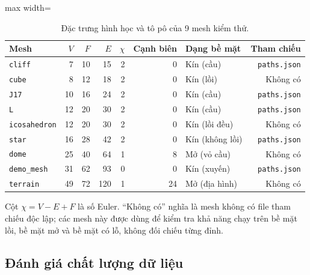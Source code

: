 \begin{table}[!t]
  \caption{Đặc trưng hình học và tô pô của 9 mesh kiểm thử.}
  \label{tab:dac-trung-mesh}
  {\fontsize{7}{8.6}\selectfont
  \setlength{\tabcolsep}{2.5pt}%
  \begin{adjustbox}{max width=\textwidth}
  \begin{tabular}{@{}lrrrrrlr@{}}
    \toprule
    \textbf{Mesh} & $V$ & $F$ & $E$ & $\chi$ & \textbf{Cạnh biên} &
    \textbf{Dạng bề mặt} & \textbf{Tham chiếu} \\
    \midrule
    \texttt{cliff}        & 7  & 10 & 15  & 2 & 0  & Kín (cầu)       & \texttt{paths.json} \\
    \texttt{cube}         & 8  & 12 & 18  & 2 & 0  & Kín (lồi)       & Không có \\
    \texttt{J17}          & 10 & 16 & 24  & 2 & 0  & Kín (cầu)       & \texttt{paths.json} \\
    \texttt{L}            & 12 & 20 & 30  & 2 & 0  & Kín (cầu)       & \texttt{paths.json} \\
    \texttt{icosahedron}  & 12 & 20 & 30  & 2 & 0  & Kín (lồi đều)   & Không có \\
    \texttt{star}         & 16 & 28 & 42  & 2 & 0  & Kín (không lồi) & \texttt{paths.json} \\
    \texttt{dome}         & 25 & 40 & 64  & 1 & 8  & Mở (vỏ cầu)     & Không có \\
    \texttt{demo\_mesh}   & 31 & 62 & 93  & 0 & 0  & Kín (xuyến)     & \texttt{paths.json} \\
    \texttt{terrain}      & 49 & 72 & 120 & 1 & 24 & Mở (địa hình)   & Không có \\
    \bottomrule
  \end{tabular}
  \end{adjustbox}
  \vspace{2pt}

  \footnotesize\raggedright
  Cột $\chi=V-E+F$ là số Euler. ``Không có'' nghĩa là mesh không có file tham
  chiếu độc lập; các mesh này được dùng để kiểm tra
  khả năng chạy trên bề mặt lồi, bề mặt mở và bề mặt có lỗ, không đối chiếu từng
  đỉnh.}
\end{table}

\subsection{Đánh giá chất lượng dữ liệu}

